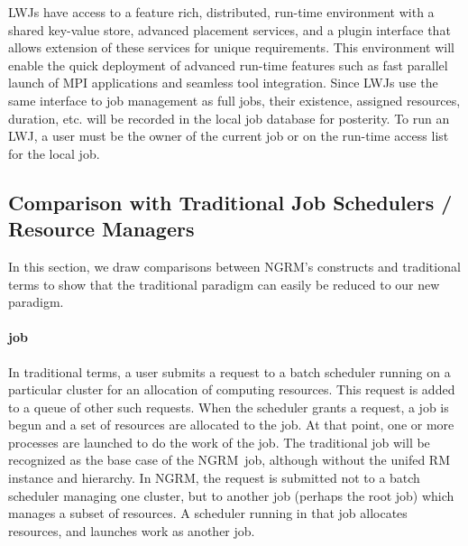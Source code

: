 \documentclass[10pt]{article}
\newcommand{\ngrm}{NGRM}
\begin{document}
LWJs have access to a feature rich, distributed,
run-time environment with a shared key-value store, advanced
placement services, and a plugin interface that allows extension
of these services for unique requirements. This environment will
enable the quick deployment of advanced run-time features such as
fast parallel launch of MPI applications and seamless tool integration. 
Since LWJs use the same interface to job management as full
jobs, their existence, assigned resources, duration, etc.
will be recorded in the local job database for posterity.
To run an LWJ, a user must be the owner of the current
job or on the run-time access list for the local job.

\subsection{Comparison with Traditional Job Schedulers / Resource Managers}
\label{sect:comparison}

In this section, we draw comparisons between \ngrm's constructs and traditional terms
to show that the traditional paradigm can easily be reduced to our new paradigm. 
\paragraph{job} In traditional terms, a user submits a request to a batch scheduler running on a particular cluster
for an allocation of computing resources.  This request is added to a
queue of other such requests.  When the scheduler grants a request, a
job is begun and a set of resources are allocated to the job.  At that
point, one or more processes are launched to do the work of the job.
The traditional job will be recognized as the base case of the \ngrm\ job,
although without the unifed RM instance and hierarchy. 
In \ngrm, the request is submitted not to a batch scheduler managing one
cluster, but to another job (perhaps the root job) which manages a subset
of resources.
A scheduler running in that job allocates resources, and launches work as
another job.
\end{document}
